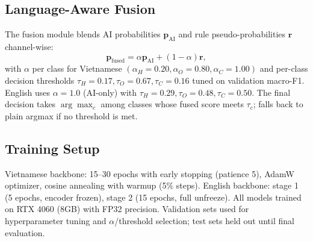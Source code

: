\subsection{Language-Aware Fusion}
The fusion module blends AI probabilities $\mathbf{p}_{\text{AI}}$ and rule pseudo-probabilities
$\mathbf{r}$ channel-wise:
\begin{equation}
    \mathbf{p}_{\text{fused}} = \alpha \mathbf{p}_{\text{AI}} + (1-\alpha) \mathbf{r},
\end{equation}
with $\alpha$ per class for Vietnamese $(\alpha_H=0.20,\alpha_O=0.80,\alpha_C=1.00)$ and per-class
decision thresholds $\tau_H=0.17,\tau_O=0.67,\tau_C=0.16$ tuned on validation macro-F1.
English uses $\alpha=1.0$ (AI-only) with $\tau_H=0.29,\tau_O=0.48,\tau_C=0.50$.
The final decision takes $\arg\max_c$ among classes whose fused score meets $\tau_c$; falls back to
plain argmax if no threshold is met.

\subsection{Training Setup}
Vietnamese backbone: 15–30 epochs with early stopping (patience 5), AdamW optimizer,
cosine annealing with warmup (5\% steps).  English backbone: stage 1 (5 epochs, encoder frozen),
stage 2 (15 epochs, full unfreeze).  All models trained on RTX 4060 (8GB) with FP32 precision.
Validation sets used for hyperparameter tuning and $\alpha$/threshold selection; test sets
held out until final evaluation.
